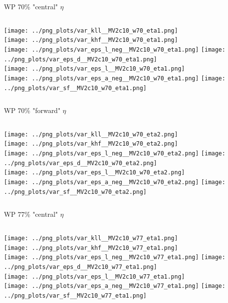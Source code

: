 \documentclass[pdflatex,8pt]{beamer}
\begin{document}
\begin{frame}{WP 70\% "central" $\eta$}
  \begin{columns}[t]
    \centering
    \texttt{[image: ../png\_plots/var\_kll\_\_MV2c10\_w70\_eta1.png]}\\
    \texttt{[image: ../png\_plots/var\_khf\_\_MV2c10\_w70\_eta1.png]}\\
    \texttt{[image: ../png\_plots/var\_eps\_l\_neg\_\_MV2c10\_w70\_eta1.png]}
    \centering
    \texttt{[image: ../png\_plots/var\_eps\_d\_\_MV2c10\_w70\_eta1.png]}\\
    \texttt{[image: ../png\_plots/var\_eps\_l\_\_MV2c10\_w70\_eta1.png]}\\
    \texttt{[image: ../png\_plots/var\_eps\_a\_neg\_\_MV2c10\_w70\_eta1.png]}
    \texttt{[image: ../png\_plots/var\_sf\_\_MV2c10\_w70\_eta1.png]}
  \end{columns}
\end{frame}

\begin{frame}{WP 70\% "forward" $\eta$}
  \begin{columns}[t]
    \centering
    \texttt{[image: ../png\_plots/var\_kll\_\_MV2c10\_w70\_eta2.png]}\\
    \texttt{[image: ../png\_plots/var\_khf\_\_MV2c10\_w70\_eta2.png]}\\
    \texttt{[image: ../png\_plots/var\_eps\_l\_neg\_\_MV2c10\_w70\_eta2.png]}
    \centering
    \texttt{[image: ../png\_plots/var\_eps\_d\_\_MV2c10\_w70\_eta2.png]}\\
    \texttt{[image: ../png\_plots/var\_eps\_l\_\_MV2c10\_w70\_eta2.png]}\\
    \texttt{[image: ../png\_plots/var\_eps\_a\_neg\_\_MV2c10\_w70\_eta2.png]}
    \texttt{[image: ../png\_plots/var\_sf\_\_MV2c10\_w70\_eta2.png]}
  \end{columns}
\end{frame}

\begin{frame}{WP 77\% "central" $\eta$}
  \begin{columns}[t]
    \centering
    \texttt{[image: ../png\_plots/var\_kll\_\_MV2c10\_w77\_eta1.png]}\\
    \texttt{[image: ../png\_plots/var\_khf\_\_MV2c10\_w77\_eta1.png]}\\
    \texttt{[image: ../png\_plots/var\_eps\_l\_neg\_\_MV2c10\_w77\_eta1.png]}
    \centering
    \texttt{[image: ../png\_plots/var\_eps\_d\_\_MV2c10\_w77\_eta1.png]}\\
    \texttt{[image: ../png\_plots/var\_eps\_l\_\_MV2c10\_w77\_eta1.png]}\\
    \texttt{[image: ../png\_plots/var\_eps\_a\_neg\_\_MV2c10\_w77\_eta1.png]}
    \texttt{[image: ../png\_plots/var\_sf\_\_MV2c10\_w77\_eta1.png]}
  \end{columns}
\end{frame}
\end{document}
